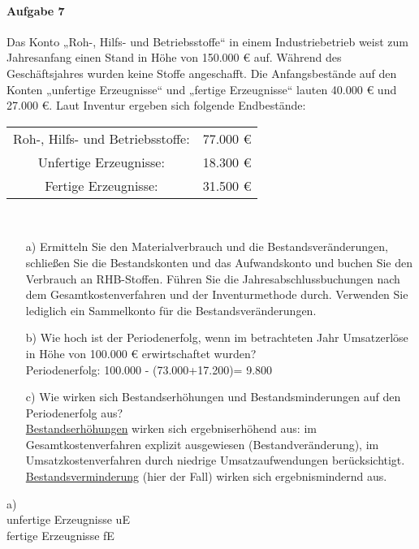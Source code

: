 \documentclass[paper=a4, fontsize=11pt]{scrartcl}
\numberwithin{equation}{section}
\numberwithin{figure}{section}
\numberwithin{table}{section}
\begin{document}
\paragraph{Aufgabe 7}
Das Konto „Roh-, Hilfs- und Betriebsstoffe“ in einem Industriebetrieb weist zum Jahresanfang einen Stand in Höhe von 150.000 € auf. Während des Geschäftsjahres wurden keine Stoffe angeschafft. Die Anfangsbestände auf den Konten „unfertige Erzeugnisse“ und „fertige Erzeugnisse“ lauten 40.000 € und 27.000 €. Laut Inventur ergeben sich folgende Endbestände: \\
\begin{tabular}{cc}
Roh-, Hilfs- und Betriebsstoffe: & 77.000 € \\
Unfertige Erzeugnisse: &  18.300 € \\
Fertige Erzeugnisse:  &  31.500 € 
\end{tabular} \\

\begin{itemize}
\item[a)] Ermitteln Sie den Materialverbrauch und die Bestandsveränderungen, schließen Sie die Bestandskonten und das Aufwandskonto und buchen Sie den Verbrauch an RHB-Stoffen. Führen Sie die Jahresabschlussbuchungen nach dem Gesamtkostenverfahren und der Inventurmethode durch. Verwenden Sie lediglich ein Sammelkonto für die Bestandsveränderungen.
\item[b)] Wie hoch ist der Periodenerfolg, wenn im betrachteten Jahr Umsatzerlöse in Höhe von 100.000 € erwirtschaftet wurden? \\

Periodenerfolg: 100.000 - (73.000+17.200)= 9.800
\item[c)] Wie wirken sich Bestandserhöhungen und Bestandsminderungen auf den Periodenerfolg aus? \\

\underline{Bestandserhöhungen} wirken sich ergebniserhöhend aus: im Gesamtkostenverfahren explizit ausgewiesen (Bestandveränderung), im Umsatzkostenverfahren durch niedrige Umsatzaufwendungen berücksichtigt. \\

\underline{Bestandsverminderung} (hier der Fall) wirken sich ergebnismindernd aus.
\end{itemize}

a) \\
unfertige Erzeugnisse uE \\
fertige Erzeugnisse fE \\
\end{document}
